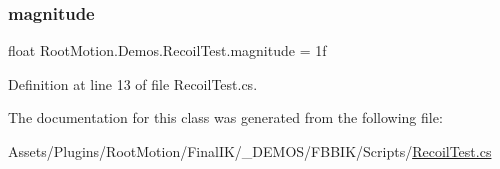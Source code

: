 \subsubsection{\texorpdfstring{magnitude}{magnitude}}
{\footnotesize\ttfamily float Root\+Motion.\+Demos.\+Recoil\+Test.\+magnitude = 1f}



Definition at line 13 of file Recoil\+Test.\+cs.



The documentation for this class was generated from the following file\+:\begin{DoxyCompactItemize}
\item 
Assets/\+Plugins/\+Root\+Motion/\+Final\+I\+K/\+\_\+\+D\+E\+M\+O\+S/\+F\+B\+B\+I\+K/\+Scripts/\mbox{\hyperlink{_recoil_test_8cs}{Recoil\+Test.\+cs}}\end{DoxyCompactItemize}
